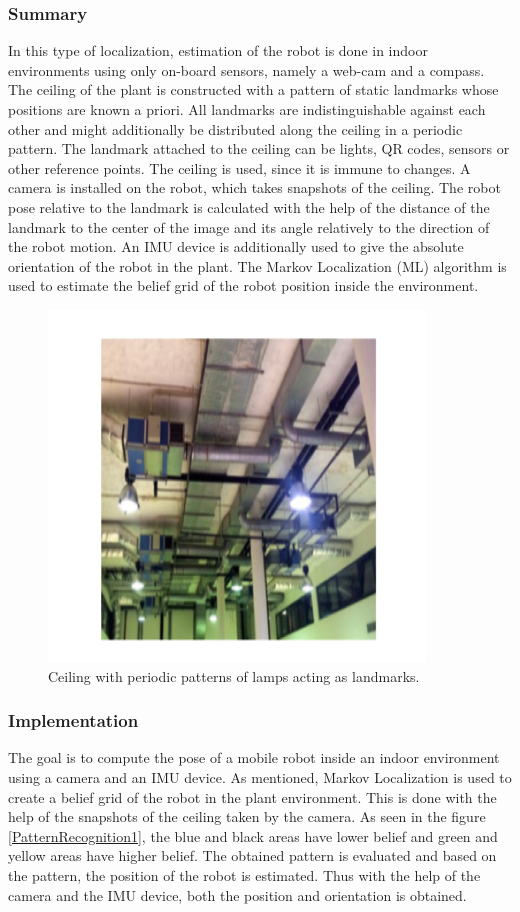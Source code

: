 \subsubsection*{Summary}
In this type of localization, estimation of the robot is done in indoor environments using
only on-board sensors, namely a web-cam and a compass. The ceiling of the plant is constructed with a pattern of static landmarks whose positions are known a priori. All landmarks are indistinguishable against each other and might additionally be distributed along the ceiling in a periodic pattern. The landmark attached to the ceiling can be lights, QR codes, sensors or other
reference points. The ceiling is used, since it is immune to changes. A camera is installed on the robot, which takes snapshots of the ceiling. The robot pose relative to the landmark is  calculated with the help of the distance of the landmark to the center of the image and its angle relatively to the direction of the  robot motion. An IMU device is additionally used to give the absolute orientation of the robot in the plant. The Markov Localization (ML) algorithm is used to estimate
the belief grid of the robot position inside the environment. 

\begin{figure}[!htbp]
	\centering
	\includegraphics[width = 10cm]{Pictures/PR.png}
	\caption{Ceiling with periodic patterns of lamps acting as landmarks. }
	\label{Pattern Recognition}
\end{figure}
\subsubsection*{Implementation}
The goal is to compute the pose of a mobile robot inside an indoor environment using a camera and an IMU device. As mentioned, Markov Localization is used to create a belief grid of the robot in the plant environment. This is done with the help of the snapshots of the ceiling taken by the camera. As seen in the figure \ref{PatternRecognition1}, the blue and black areas have lower belief and green and yellow areas have higher belief. The obtained pattern is evaluated and based on the pattern, the position of the robot is estimated. Thus with the help of the camera and the IMU device, both the position and orientation is obtained. 



